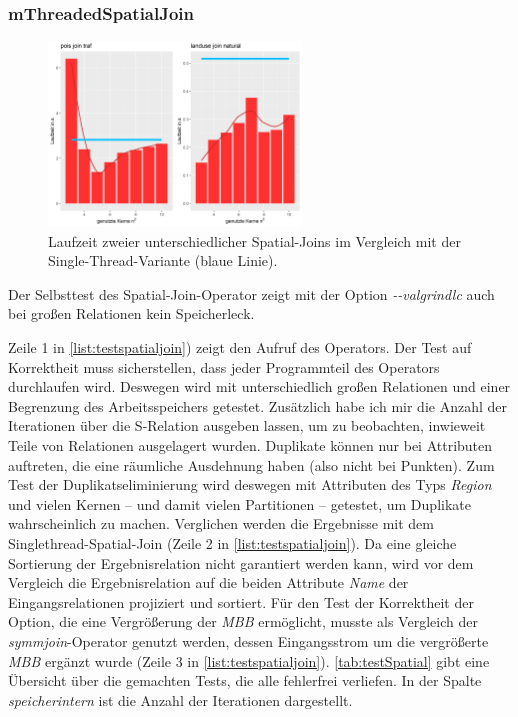 \documentclass[a4paper,12pt,twoside]{article}
\newcommand{\Fb}[1]{\textit{#1}} %
\begin{document}
\subsubsection{mThreadedSpatialJoin}

\begin{figure}
	\centering
	\includegraphics[width=0.60\textwidth]{Bilder/sj_kerne.png}
	\caption{Laufzeit zweier unterschiedlicher Spatial-Joins im Vergleich mit der Single-Thread-Variante (blaue Linie).}
	\label{img:sjKern}
\end{figure}

Der Selbsttest des Spatial-Join-Operator zeigt mit der Option \Fb{-{}-valgrindlc} auch bei großen Relationen kein Speicherleck.

Zeile 1 in \autoref{list:testspatialjoin}) zeigt den Aufruf des Operators. Der Test auf Korrektheit muss sicherstellen, dass jeder Programmteil des Operators durchlaufen wird. Deswegen wird mit unterschiedlich großen Relationen und einer Begrenzung des Arbeitsspeichers getestet. Zusätzlich habe ich mir die Anzahl der Iterationen über die S-Relation ausgeben lassen, um zu beobachten, inwieweit Teile von Relationen ausgelagert wurden. Duplikate können nur bei Attributen auftreten, die eine räumliche Ausdehnung haben (also nicht bei Punkten). Zum Test der Duplikatseliminierung wird deswegen mit Attributen des Typs \Fb{Region} und vielen Kernen -- und damit vielen Partitionen -- getestet, um Duplikate wahrscheinlich zu machen. Verglichen werden die Ergebnisse mit dem Singlethread-Spatial-Join (Zeile 2 in \autoref{list:testspatialjoin}). Da eine gleiche Sortierung der Ergebnisrelation nicht garantiert werden kann, wird vor dem Vergleich die Ergebnisrelation auf die beiden Attribute \Fb{Name} der Eingangsrelationen projiziert und sortiert. Für den Test der Korrektheit der Option, die eine Vergrößerung der \Fb{MBB} ermöglicht, musste als Vergleich der \Fb{symmjoin}-Operator genutzt werden, dessen Eingangsstrom um die vergrößerte \Fb{MBB} ergänzt wurde (Zeile 3 in \autoref{list:testspatialjoin}). \autoref{tab:testSpatial} gibt eine Übersicht über die gemachten Tests, die alle fehlerfrei verliefen. In der Spalte \Fb{speicherintern} ist die Anzahl der Iterationen dargestellt. 
\end{document}
